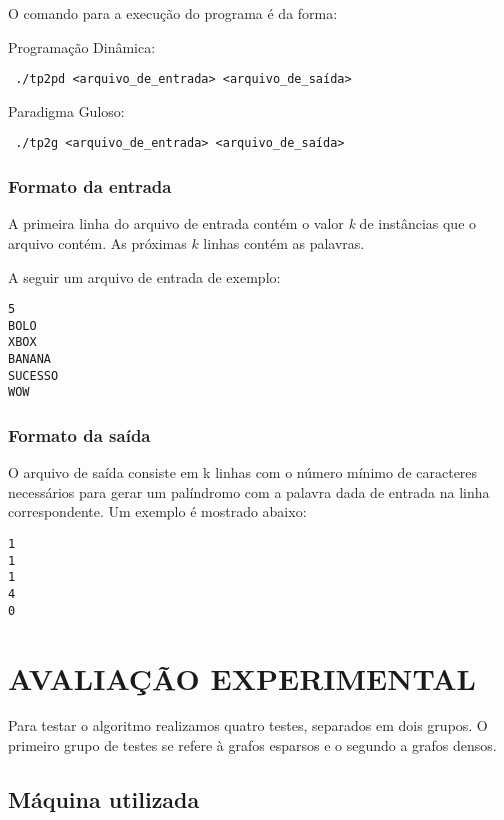 \documentclass[12pt]{article}
\begin{document}
O comando para a execução do programa é da forma:

Programação Dinâmica:
\begin{footnotesize}
\begin{verbatim} ./tp2pd <arquivo_de_entrada> <arquivo_de_saída>\end{verbatim}
\end{footnotesize}

Paradigma Guloso:
\begin{footnotesize}
\begin{verbatim} ./tp2g <arquivo_de_entrada> <arquivo_de_saída>\end{verbatim}
\end{footnotesize}

\subsubsection{Formato da entrada}

A primeira linha do arquivo de entrada contém o valor \textit{k} de instâncias que o arquivo contém. As próximas $k$ linhas contém as palavras.

A seguir um arquivo de entrada de exemplo:

\begin{verbatim}
5
BOLO
XBOX
BANANA
SUCESSO
WOW
\end{verbatim}

\subsubsection{Formato da saída}

O arquivo de saída consiste em k linhas com o número mínimo de caracteres necessários para gerar um palíndromo com a palavra dada de entrada na linha correspondente. Um exemplo é mostrado abaixo:

\begin{verbatim}
1
1
1
4
0
\end{verbatim}


\section{AVALIAÇÃO EXPERIMENTAL}
\label{avaliacao_experimental}

Para testar o algoritmo realizamos quatro testes, separados em dois grupos. O primeiro grupo de testes se refere à grafos esparsos e o segundo a grafos densos.

\subsection{Máquina utilizada}
\label{maquina}
\end{document}

